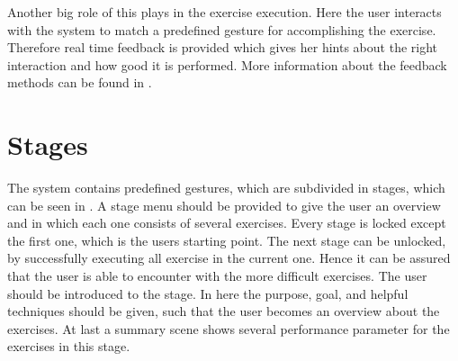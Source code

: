 Another big role of this plays in the exercise execution. Here the user interacts with the system to match a predefined gesture for accomplishing the exercise. Therefore real time feedback is provided which gives her hints about the right interaction and how good it is performed. More information about the feedback methods can be found in \textbf{}.

\section{Stages}\label{4_4_stages}
The system contains predefined gestures, which are subdivided in stages, which can be seen in \textbf{}. A stage menu should be provided to give the user an overview and in which each one consists of several exercises. Every stage is locked except the first one, which is the users starting point. The next stage can be unlocked, by successfully executing all exercise in the current one. Hence it can be assured that the user is able to encounter with the more difficult exercises. The user should be introduced to the stage. In here the purpose, goal, and helpful techniques should be given, such that the user becomes an overview about the exercises. At last a summary scene shows several performance parameter for the exercises in this stage.

